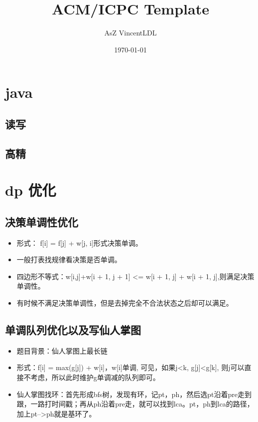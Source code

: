 \documentclass[landscape]{report}
\newcommand{\includecode}[2][c]{}
\begin{document}
 
\begin{flushleft}

\dominitoc[n]
\title{ACM/ICPC Template}
\author{AsZ VincentLDL}
\date{\today}
\maketitle
\setcounter{secnumdepth}{3}
\tableofcontents
\newpage
\begin{multicols}{2}
\chapter{ java}
\section{ 读写}
\section{ 高精}

\chapter{ dp 优化}
\section{ 决策单调性优化}
\begin{itemize}
\item 形式： f[i] = f[j] + w[j, i]形式决策单调。
\item 一般打表找规律看决策是否单调。
\item 四边形不等式：w[i,j]+w[i + 1, j + 1] <= w[i + 1, j] + w[i + 1, j],则满足决策单调性。
\item 有时候不满足决策单调性，但是去掉完全不合法状态之后却可以满足。
\end{itemize}
 \includecode[c++]{hnoi2008toys.cpp}   

\section{ 单调队列优化以及写仙人掌图}
\begin{itemize}
\item 题目背景：仙人掌图上最长链
\item 形式：f[i] = max(g[j]) + w[i]，w[i]单调, 可见，如果j<k, g[j]<g[k], 则j可以直接不考虑，所以此时维护g单调减的队列即可。
\item 仙人掌图找环：首先形成bfs树，发现有环，记pt，ph，然后选pt沿着pre走到跟，一路打时间戳；再从ph沿着pre走，就可以找到lca。pt，ph到lca的路径，加上pt-->ph就是基环了。
\end{itemize}
\includecode[c++]{ioi2008Island.cpp}

\end{multicols}
\end{flushleft}
\end{document}
